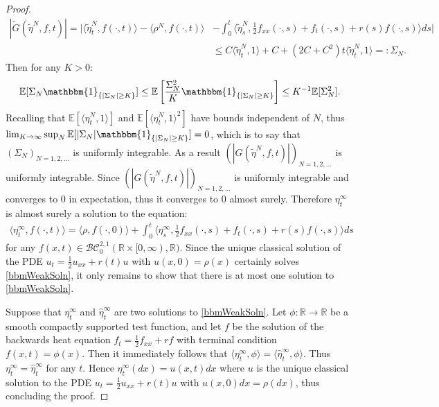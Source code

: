 \documentclass{article}
\newcommand{\B}[1]{\mathbb{#1}}
\newcommand{\C}[1]{\mathcal{#1}}
\newcommand{\is}{\mathbbm{1}}
\begin{document}
\begin{proof}
    \begin{align*}|\tilde{G}(\tilde{\eta}^N,f,t)|=|\langle \tilde{\eta}_t^N,f(\cdot,t)\rangle - \langle \rho^N,f(\cdot,t)\rangle &- \int_0^t \langle \tilde{\eta}_s^N,\frac12 f_{xx}(\cdot,s)+f_t(\cdot,s)+r(s)f(\cdot,s)\rangle ds|\\
    &\leq C\langle \tilde{\eta}^N_t,1\rangle + C + (2C + C^2)t\langle \tilde{\eta}^N_t,1\rangle=:\Sigma_N.\end{align*}
    Then for any $K>0$:
    \begin{align*}
        \B{E}[\Sigma_N\is_{\{|\Sigma_N|\geq K\}}]\leq \B{E}\left[\frac{\Sigma_N^2}{K}\is_{\{|\Sigma_N|\geq K\}}\right]\leq K^{-1}\B{E}[\Sigma_N^2].
    \end{align*}
    Recalling that $\B{E}[\langle \eta_t^N,1\rangle]$ and $\B{E}[\langle \eta_t^N,1\rangle^2]$ have bounds independent of $N$, thus $\lim_{K\to\infty}\sup_{N}\B{E}[|\Sigma_N|\is_{\{|\Sigma_N|\geq K\}}]=0$, which is to say that $(\Sigma_N)_{N=1,2,\ldots}$ is uniformly integrable. As a result $(|G(\tilde{\eta}^N,f,t)|)_{N=1,2,\ldots}$ is uniformly integrable. Since $(|G(\tilde{\eta}^N,f,t)|)_{N=1,2,\ldots}$ is uniformly integrable and converges to $0$ in expectation, thus it converges to $0$ almost surely. Therefore $\eta_t^\infty$ is almost surely a solution to the equation:
    \begin{align} \label{bbmWeakSoln}
        \langle \eta_t^\infty,f(\cdot,t)\rangle = \langle \rho,f(\cdot,0)\rangle + \int_0^t \langle \eta_s^\infty,\frac12 f_{xx}(\cdot,s)+f_t(\cdot,s)+r(s)f(\cdot,s)\rangle ds
    \end{align}
    for any $f(x,t)\in \C{BC}^{2,1}_0(\B{R}\times [0,\infty),\B{R})$. Since the unique classical solution of the PDE $u_t = \frac12 u_{xx} + r(t)u$ with $u(x,0)=\rho(x)$ certainly solves \eqref{bbmWeakSoln}, it only remains to show that there is at most one solution to \eqref{bbmWeakSoln}.

    Suppose that $\eta_t^\infty$ and $\hat{\eta}_t^\infty$ are two solutions to \eqref{bbmWeakSoln}. Let $\phi:\B{R}\to\B{R}$ be a smooth compactly supported test function, and let $f$ be the solution of the backwards heat equation $f_t=\frac12f_{xx}+rf$ with terminal condition $f(x,t)=\phi(x)$. Then it immediately follows that $\langle \eta_t^\infty, \phi\rangle = \langle \hat{\eta}_t^\infty, \phi\rangle$. Thus $\eta_t^\infty=\hat{\eta}_t^\infty$ for any $t$. Hence $\eta^\infty_t(dx)=u(x,t)dx$ where $u$ is the unique classical solution to the PDE $u_t=\frac12 u_{xx}+r(t)u$ with $u(x,0)dx=\rho(dx)$, thus concluding the proof. 
\end{proof}
\end{document}
